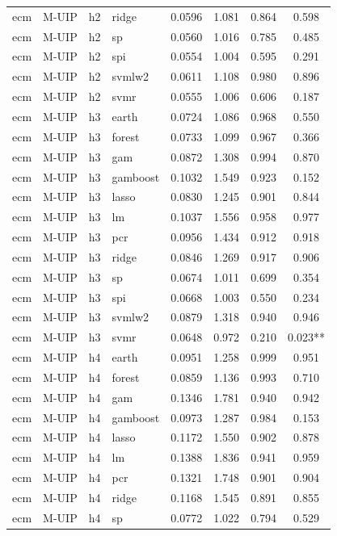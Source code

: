 \begin{ThreePartTable}
\begin{longtable}[t]{llclcccc}
ecm & M-UIP & h2 & ridge & 0.0596 & 1.081 & 0.864 & 0.598\\
ecm & M-UIP & h2 & sp & 0.0560 & 1.016 & 0.785 & 0.485\\
ecm & M-UIP & h2 & spi & 0.0554 & 1.004 & 0.595 & 0.291\\
ecm & M-UIP & h2 & svmlw2 & 0.0611 & 1.108 & 0.980 & 0.896\\
ecm & M-UIP & h2 & svmr & 0.0555 & 1.006 & 0.606 & 0.187\\
\addlinespace
ecm & M-UIP & h3 & earth & 0.0724 & 1.086 & 0.968 & 0.550\\
ecm & M-UIP & h3 & forest & 0.0733 & 1.099 & 0.967 & 0.366\\
ecm & M-UIP & h3 & gam & 0.0872 & 1.308 & 0.994 & 0.870\\
ecm & M-UIP & h3 & gamboost & 0.1032 & 1.549 & 0.923 & 0.152\\
ecm & M-UIP & h3 & lasso & 0.0830 & 1.245 & 0.901 & 0.844\\
ecm & M-UIP & h3 & lm & 0.1037 & 1.556 & 0.958 & 0.977\\
ecm & M-UIP & h3 & pcr & 0.0956 & 1.434 & 0.912 & 0.918\\
ecm & M-UIP & h3 & ridge & 0.0846 & 1.269 & 0.917 & 0.906\\
ecm & M-UIP & h3 & sp & 0.0674 & 1.011 & 0.699 & 0.354\\
ecm & M-UIP & h3 & spi & 0.0668 & 1.003 & 0.550 & 0.234\\
ecm & M-UIP & h3 & svmlw2 & 0.0879 & 1.318 & 0.940 & 0.946\\
ecm & M-UIP & h3 & svmr & 0.0648 & 0.972 & 0.210 & 0.023**\\
\addlinespace
ecm & M-UIP & h4 & earth & 0.0951 & 1.258 & 0.999 & 0.951\\
ecm & M-UIP & h4 & forest & 0.0859 & 1.136 & 0.993 & 0.710\\
ecm & M-UIP & h4 & gam & 0.1346 & 1.781 & 0.940 & 0.942\\
ecm & M-UIP & h4 & gamboost & 0.0973 & 1.287 & 0.984 & 0.153\\
ecm & M-UIP & h4 & lasso & 0.1172 & 1.550 & 0.902 & 0.878\\
ecm & M-UIP & h4 & lm & 0.1388 & 1.836 & 0.941 & 0.959\\
ecm & M-UIP & h4 & pcr & 0.1321 & 1.748 & 0.901 & 0.904\\
ecm & M-UIP & h4 & ridge & 0.1168 & 1.545 & 0.891 & 0.855\\
ecm & M-UIP & h4 & sp & 0.0772 & 1.022 & 0.794 & 0.529\\

\end{longtable}
\end{ThreePartTable}
